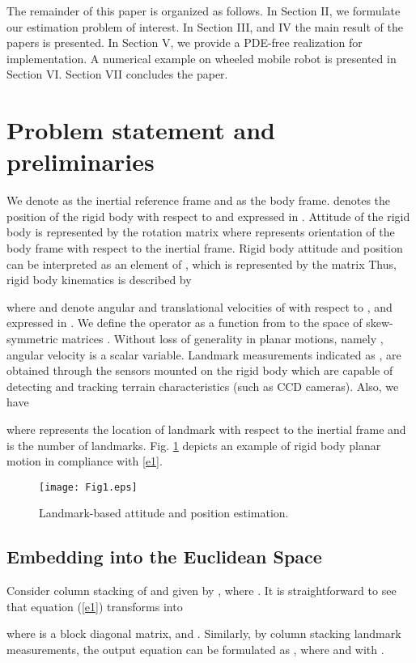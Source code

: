 \documentclass[12pt,draftcls,onecolumn]{IEEEtran}
\begin{document}
The remainder of this paper is organized as follows. In Section II, we formulate our estimation problem of interest. In Section III, and IV the main result of the papers is presented. In Section V, we provide a PDE-free realization for implementation. 
A numerical example on wheeled mobile robot is presented in Section VI. Section VII concludes the paper.
\section{Problem statement and preliminaries}

We denote  as the inertial reference frame and  as the body frame.   denotes the position of the rigid body with respect to   and expressed in . Attitude of the rigid body is represented by the rotation matrix  where  represents orientation of the body frame with respect to the inertial frame.
Rigid body attitude  and position  can be interpreted as an element of , which is represented by the matrix  Thus, rigid body kinematics is described by

where  and  denote angular and translational velocities of  with respect to , and expressed in . We define the operator  as a function from   to the space of skew-symmetric matrices . Without loss of generality in planar motions,  namely , angular velocity is a scalar variable. 
Landmark measurements indicated as , are obtained through the sensors mounted on the rigid body which are capable of detecting and tracking terrain characteristics (such as CCD cameras). Also, we have

where  represents the location of  landmark with respect to the inertial frame  and  is the number of landmarks. Fig. \ref{F1} depicts an example of rigid body planar motion in compliance with \eqref{e1}.

\begin{figure}
\centering
\texttt{[image: Fig1.eps]}
\caption{Landmark-based attitude and position estimation.}
\label{F1}
\end{figure}


\subsection{Embedding  into the Euclidean Space}

Consider column stacking of  and  given by , where . It is straightforward to see that equation (\ref{e1}) transforms into

where  is a block diagonal matrix, and  .
Similarly, by column stacking landmark measurements, the output equation  can be formulated as , where  and 
with .
\end{document}

